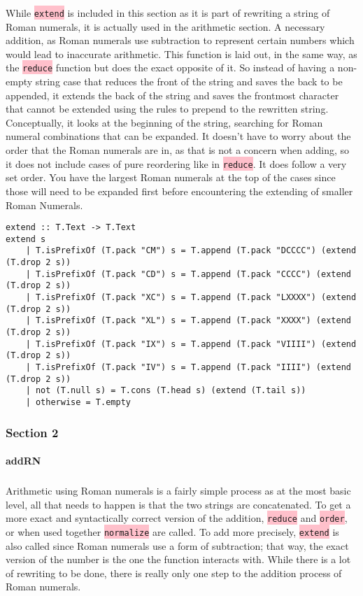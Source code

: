 \documentclass{article}
\begin{document}
While \colorbox{pink}{\lstinline{extend}} is included in this section as it is part of rewriting a string of Roman numerals, it is actually used in the arithmetic section. A necessary addition, as Roman numerals use subtraction to represent certain numbers which would lead to inaccurate arithmetic. This function is laid out, in the same way, as the \colorbox{pink}{\lstinline{reduce}} function but does the exact opposite of it. So instead of having a non-empty string case that reduces the front of the string and saves the back to be appended, it extends the back of the string and saves the frontmost character that cannot be extended using the rules to prepend to the rewritten string. Conceptually, it looks at the beginning of the string, searching for Roman numeral combinations that can be expanded. It doesn’t have to worry about the order that the Roman numerals are in, as that is not a concern when adding, so it does not include cases of pure reordering like in \colorbox{pink}{\lstinline{reduce}}. It does follow a very set order. You have the largest Roman numerals at the top of the cases since those will need to be expanded first before encountering the extending of smaller Roman Numerals.

\begin{lstlisting}
extend :: T.Text -> T.Text
extend s
    | T.isPrefixOf (T.pack "CM") s = T.append (T.pack "DCCCC") (extend (T.drop 2 s))
    | T.isPrefixOf (T.pack "CD") s = T.append (T.pack "CCCC") (extend (T.drop 2 s))
    | T.isPrefixOf (T.pack "XC") s = T.append (T.pack "LXXXX") (extend (T.drop 2 s))
    | T.isPrefixOf (T.pack "XL") s = T.append (T.pack "XXXX") (extend (T.drop 2 s))
    | T.isPrefixOf (T.pack "IX") s = T.append (T.pack "VIIII") (extend (T.drop 2 s))
    | T.isPrefixOf (T.pack "IV") s = T.append (T.pack "IIII") (extend (T.drop 2 s))
    | not (T.null s) = T.cons (T.head s) (extend (T.tail s))
    | otherwise = T.empty
\end{lstlisting}

\subsubsection{Section 2}

\paragraph{addRN}

\subparagraph{}

Arithmetic using Roman numerals is a fairly simple process as at the most basic level, all that needs to happen is that the two strings are concatenated. To get a more exact and syntactically correct version of the addition, \colorbox{pink}{\lstinline{reduce}} and \colorbox{pink}{\lstinline{order}}, or when used together \colorbox{pink}{\lstinline{normalize}} are called. To add more precisely, \colorbox{pink}{\lstinline{extend}} is also called since Roman numerals use a form of subtraction; that way, the exact version of the number is the one the function interacts with. While there is a lot of rewriting to be done, there is really only one step to the addition process of Roman numerals. 
\end{document}
